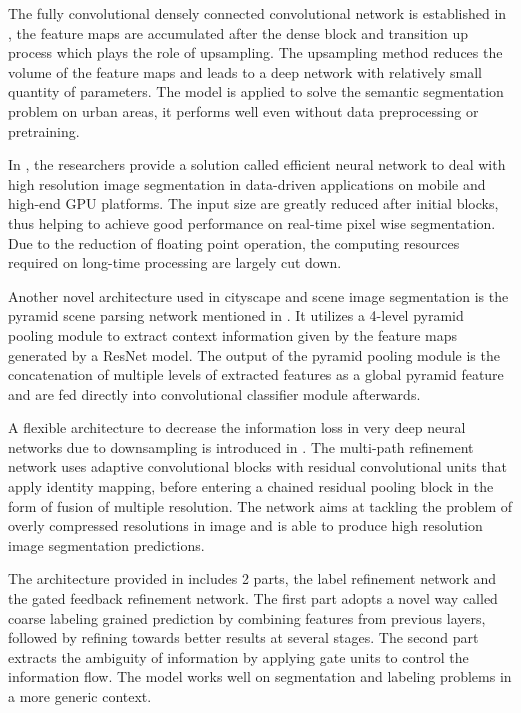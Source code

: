 \documentclass{article}
\begin{document}
The fully convolutional densely connected convolutional network is established in \cite{jegou2017one}, the feature maps are accumulated after the dense block and transition up process which plays the role of upsampling.
The upsampling method reduces the volume of the feature maps and leads to a deep network with relatively small quantity of parameters.
The model is applied to solve the semantic segmentation problem on urban areas, it performs well even without data preprocessing or pretraining.

In \cite{paszke2016enet}, the researchers provide a solution called efficient neural network to deal with high resolution image segmentation in data-driven applications on mobile and high-end GPU platforms.
The input size are greatly reduced after initial blocks, thus helping to achieve good performance on real-time pixel wise segmentation.
Due to the reduction of floating point operation, the computing resources required on long-time processing are largely cut down.

Another novel architecture used in cityscape and scene image segmentation is the pyramid scene parsing network mentioned in \cite{zhao2017pyramid}.
It utilizes a 4-level pyramid pooling module to extract context information given by the feature maps generated by a ResNet model.
The output of the pyramid pooling module is the concatenation of multiple levels of extracted features as a global pyramid feature and are fed directly into convolutional classifier module afterwards.

A flexible architecture to decrease the information loss in very deep neural networks due to downsampling is introduced in \cite{lin2017refinenet}.
The multi-path refinement network uses adaptive convolutional blocks with residual convolutional units that apply identity mapping, before entering a chained residual pooling block in the form of fusion of multiple resolution.
The network aims at tackling the problem of overly compressed resolutions in image and is able to produce high resolution image segmentation predictions.

The architecture provided in \cite{islam2018gated} includes 2 parts, the label refinement network and the gated feedback refinement network.
The first part adopts a novel way called coarse labeling grained prediction by combining features from previous layers, followed by refining towards better results at several stages.
The second part extracts the ambiguity of information by applying gate units to control the information flow. The model works well on segmentation and labeling problems in a more generic context.
\end{document}
